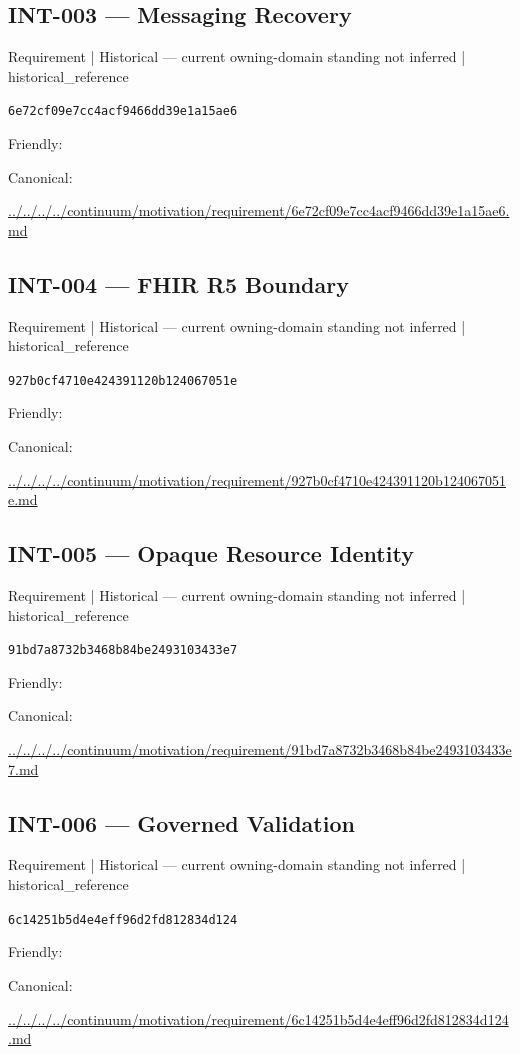 \documentclass[10pt,a4paper]{article}
\begin{document}
\subsection*{INT-003 — Messaging Recovery}
{\small Requirement | Historical — current owning-domain standing not inferred | historical\_reference}\par
\texttt{6e72cf09e7cc4acf9466dd39e1a15ae6}\par
Friendly: \par
Canonical: \par
{\footnotesize\url{../../../../continuum/motivation/requirement/6e72cf09e7cc4acf9466dd39e1a15ae6.md}}\par
\subsection*{INT-004 — FHIR R5 Boundary}
{\small Requirement | Historical — current owning-domain standing not inferred | historical\_reference}\par
\texttt{927b0cf4710e424391120b124067051e}\par
Friendly: \par
Canonical: \par
{\footnotesize\url{../../../../continuum/motivation/requirement/927b0cf4710e424391120b124067051e.md}}\par
\subsection*{INT-005 — Opaque Resource Identity}
{\small Requirement | Historical — current owning-domain standing not inferred | historical\_reference}\par
\texttt{91bd7a8732b3468b84be2493103433e7}\par
Friendly: \par
Canonical: \par
{\footnotesize\url{../../../../continuum/motivation/requirement/91bd7a8732b3468b84be2493103433e7.md}}\par
\subsection*{INT-006 — Governed Validation}
{\small Requirement | Historical — current owning-domain standing not inferred | historical\_reference}\par
\texttt{6c14251b5d4e4eff96d2fd812834d124}\par
Friendly: \par
Canonical: \par
{\footnotesize\url{../../../../continuum/motivation/requirement/6c14251b5d4e4eff96d2fd812834d124.md}}\par
\end{document}
